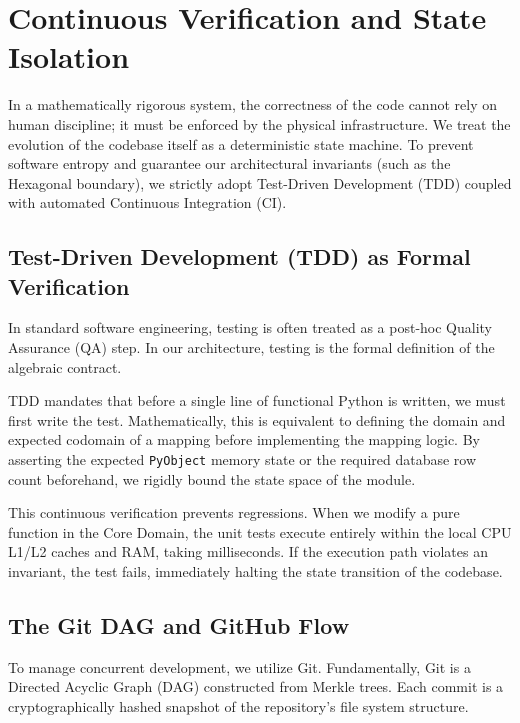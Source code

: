 \section{Continuous Verification and State Isolation}

In a mathematically rigorous system, the correctness of the code cannot rely on human discipline; it must be enforced by the physical infrastructure. We treat the evolution of the codebase itself as a deterministic state machine. To prevent software entropy and guarantee our architectural invariants (such as the Hexagonal boundary), we strictly adopt Test-Driven Development (TDD) coupled with automated Continuous Integration (CI).

\subsection*{Test-Driven Development (TDD) as Formal Verification}
In standard software engineering, testing is often treated as a post-hoc Quality Assurance (QA) step. In our architecture, testing is the formal definition of the algebraic contract.

TDD mandates that before a single line of functional Python is written, we must first write the test. Mathematically, this is equivalent to defining the domain and expected codomain of a mapping before implementing the mapping logic. By asserting the expected \texttt{PyObject} memory state or the required database row count beforehand, we rigidly bound the state space of the module.

This continuous verification prevents regressions. When we modify a pure function in the Core Domain, the unit tests execute entirely within the local CPU L1/L2 caches and RAM, taking milliseconds. If the execution path violates an invariant, the test fails, immediately halting the state transition of the codebase.

\subsection*{The Git DAG and GitHub Flow}
To manage concurrent development, we utilize Git. Fundamentally, Git is a Directed Acyclic Graph (DAG) constructed from Merkle trees. Each commit is a cryptographically hashed snapshot of the repository's file system structure.

